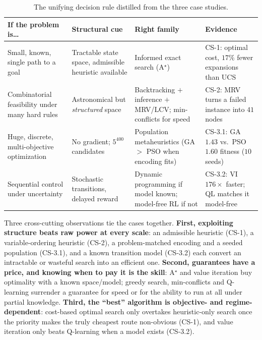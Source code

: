 \documentclass[10pt]{article}
\begin{document}
\begin{table}[t]
\centering
\caption{The unifying decision rule distilled from the three case studies.}
\label{tab:synth}
\small
\renewcommand{\arraystretch}{1.3}
\begin{tabular}{@{}p{3.15cm} p{3.95cm} p{3.95cm} p{3.35cm}@{}}
\toprule
\textbf{If the problem is\ldots} & \textbf{Structural cue} & \textbf{Right family} & \textbf{Evidence} \\
\midrule
Small, known, single path to a goal & Tractable state space, admissible heuristic available & Informed exact search (A$^\star$) & CS-1: optimal cost, $17\%$ fewer expansions than UCS \\
Combinatorial feasibility under many hard rules & Astronomical but \emph{structured} space & Backtracking $+$ inference $+$ MRV/LCV; min-conflicts for speed & CS-2: MRV turns a failed instance into $41$ nodes \\
Huge, discrete, multi-objective optimization & No gradient; $5^{400}$ candidates & Population metaheuristics (GA $>$ PSO when encoding fits) & CS-3.1: GA $1.43$ vs.\ PSO $1.60$ fitness ($10$ seeds) \\
Sequential control under uncertainty & Stochastic transitions, delayed reward & Dynamic programming if model known; model-free RL if not & CS-3.2: VI $176\times$ faster; QL matches it model-free \\
\bottomrule
\end{tabular}
\end{table}

Three cross-cutting observations tie the cases together. \textbf{First,
exploiting structure beats raw power at every scale}: an admissible heuristic
(CS-1), a variable-ordering heuristic (CS-2), a problem-matched encoding and a
seeded population (CS-3.1), and a known transition model (CS-3.2) each convert an
intractable or wasteful search into an efficient one. \textbf{Second, guarantees
have a price, and knowing when to pay it is the skill}: A$^\star$ and value
iteration buy optimality with a known space/model; greedy search, min-conflicts
and Q-learning surrender a guarantee for speed or for the ability to run at all
under partial knowledge. \textbf{Third, the ``best'' algorithm is objective- and
regime-dependent}: cost-based optimal search only overtakes heuristic-only search
once the priority makes the truly cheapest route non-obvious (CS-1), and value
iteration only beats Q-learning when a model exists (CS-3.2).
\end{document}
